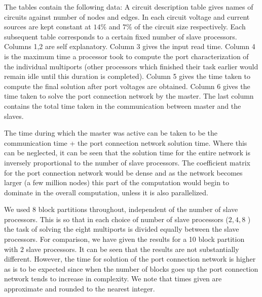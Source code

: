 \documentclass[12pt,psfig,a4]{article}
\begin{document}
The tables contain the following data:
A circuit description table gives names of circuits against number of nodes and edges.
In each circuit voltage and current sources are kept constant at
$14\%$ and $7\%$ of the circuit size respectively.
Each subsequent table corresponds to a certain fixed number of slave processors.
Columns 1,2 are self explanatory. Column 3 gives the input read time. Column 4 is the maximum time 
a processor took to compute the port characterization of the
individual multiports (other processors which finished 
their task earlier would remain idle until this duration is completed).
Column 5 gives the time taken to compute the final solution
after port voltages are obtained. 
Column 6 gives the time taken to solve the port connection   
network by the master.
The last column contains the total time taken in the communication
between master and the slaves.\par

The time during which the master was active can be taken to be
the communication time + the port connection network solution time.
Where this can be neglected, it can be seen that the solution time 
for the entire network is inversely proportional to the number of slave 
processors. The coefficient matrix for  the port connection network
would be dense and as the network becomes larger (a few million
nodes) this part of the computation would begin to dominate in the overall
computation, unless it is also parallelized. \par

We used $8$ block partitions throughout, independent of the number of 
slave processors. This is so that in each choice of  
number of slave processors ($2,4,8$ ) the task of solving the eight multiports is divided
equally between the slave processors.
For comparison, we have given the results for a 10 block partition with $2$
slave processors. It can be seen that the results are not substantially different.
However, the time for solution of the port connection network is higher
as is to be expected since when the number of blocks goes up the port connection
network tends to increase in complexity.
We note that times given are approximate and rounded to the nearest
integer. 

\newpage
\end{document}
